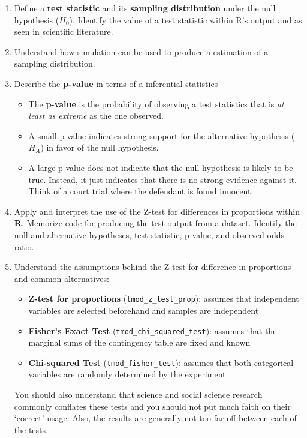 \documentclass[11pt]{article}
\begin{document}
\begin{enumerate}
\item Define a \textbf{test statistic} and its \textbf{sampling distribution} under
the null hypothesis ($H_{0}$). Identify the value of a test statistic within R's output
and as seen in scientific literature.

\item Understand how simulation can be used to produce a estimation of a sampling
distribution.

\item Describe the \textbf{p-value} in terms of a inferential statistics
\begin{itemize}
\renewcommand{\labelitemi}{{\textcolor{dark}{{\tiny $\blacksquare$}}}}
\item The \textbf{p-value} is the probability of observing a test statistics that is
\textit{at least as extreme} as the one observed.
\item A small p-value indicates strong support for the alternative hypothesis
($H_{A}$) in favor of the null hypothesis.
\item A large p-value does \underline{not} indicate that the null hypothesis
is likely to be true. Instead, it just indicates that there is no strong
evidence against it. Think of a court trial where the defendant is found
innocent.
\end{itemize}

\item Apply and interpret the use of the Z-test for differences in proportions
within \textbf{R}. Memorize code for producing the test output from a dataset. Identify
the null and alternative hypotheses, test statistic, p-value, and observed
odds ratio.

\item Understand the assumptions behind the Z-test for difference in proportions
and common alternatives:
\begin{itemize}
\renewcommand{\labelitemi}{{\textcolor{dark}{{\tiny $\blacksquare$}}}}
\item \textbf{Z-test for proportions} (\texttt{tmod\_z\_test\_prop}): assumes
that independent variables are selected beforehand and samples are independent
\item \textbf{Fisher's Exact Test} (\texttt{tmod\_chi\_squared\_test}):
assumes that the marginal sums of the contingency table are fixed and known
\item \textbf{Chi-squared Test} (\texttt{tmod\_fisher\_test}): assumes that
both categorical variables are randomly determined by the experiment
\end{itemize}
You should also understand that science and social science research commonly
conflates these tests and you should not put much faith on their `correct'
usage. Also, the results are generally not too far off between each of the
tests.


\end{enumerate}
\end{document}
